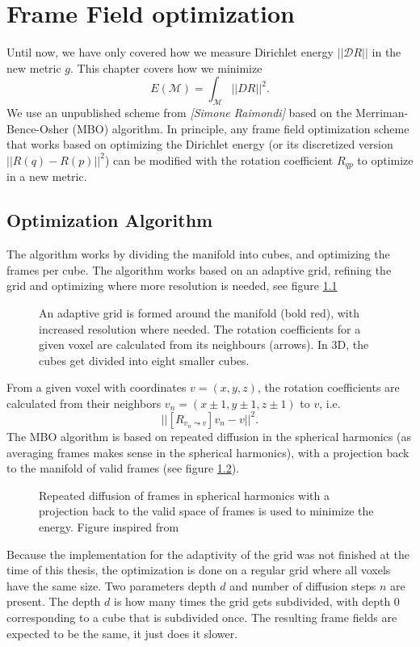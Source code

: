 \documentclass[../thesis.tex]{subfiles}
\begin{document}
\chapter{Frame Field optimization}
\label{ch:optimization}
Until now, we have only covered how we measure Dirichlet energy $||\mathcal{D}R||$ in
the new metric $g$.
This chapter covers how we minimize
$$E(\mathcal{M})=\int_{\mathcal{M}}||DR||^2.$$
We use an unpublished scheme from \emph{[Simone Raimondi]} based
on the Merriman-Bence-Osher (MBO) algorithm.
In principle, any frame field optimization scheme that works based on
optimizing the Dirichlet energy (or its discretized version $||R(q)-R(p)||^2$) can be
modified with the rotation coefficient $R_{qp}$ to optimize in a new metric.
\section{Optimization Algorithm}
The algorithm works by dividing the manifold into cubes,
and optimizing the frames per cube. The algorithm works based on an adaptive
grid, refining the grid and optimizing where more resolution is needed, see figure \ref{fig:grid} 
\begin{figure}[htb]
    \centering
    \def\svgwidth{20em}
    
    \caption{An adaptive grid is formed around the manifold (bold red), with increased resolution where needed.
    The rotation coefficients for a given voxel are calculated from its neighbours (arrows).
    In 3D, the cubes get divided into eight smaller cubes.}
    \label{fig:grid}
\end{figure}
From a given voxel with coordinates $v=(x,y,z)$, the rotation coefficients
are calculated from their neighbors $v_n=(x\pm 1,y\pm 1,z\pm 1)$ to $v$,
i.e. $$||[R_{v_n\leadsto v}]v_n - v||^2.$$
The MBO algorithm is based on repeated diffusion in the spherical harmonics (as averaging frames
makes sense in the spherical harmonics), with a projection back to the manifold
of valid frames (see figure \ref{fig:diffusionprojection}).
\begin{figure}[htb]
    \centering
    \def\svgwidth{20em}
    
    \caption{Repeated diffusion of frames in spherical harmonics with a projection back to the
    valid space of frames is used to minimize the energy. Figure inspired from \cite{Palmer} }
    \label{fig:diffusionprojection}
\end{figure}


Because the implementation for the adaptivity of the grid was not finished
at the time of this thesis, the optimization is done on a regular grid where
all voxels have the same size. Two parameters depth $d$ and number of diffusion steps $n$
are present. The depth $d$ is how many times the grid gets subdivided, with depth $0$
corresponding to a cube that is subdivided once.
The resulting frame fields are expected to be the same, it just does it slower.
\end{document}
